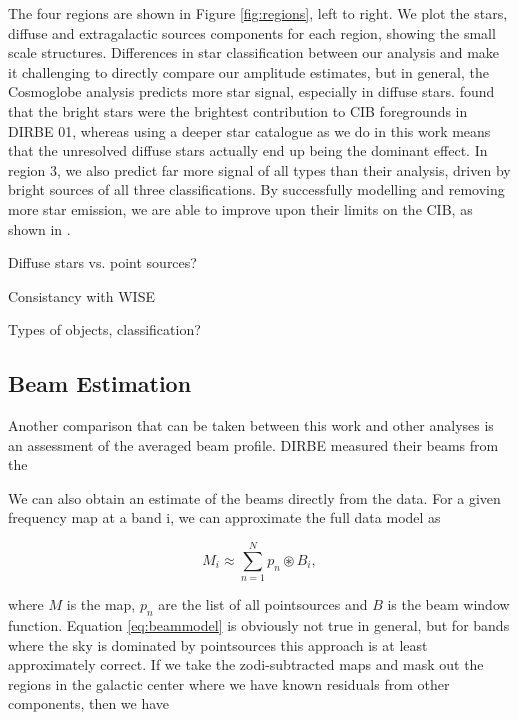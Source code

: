 \documentclass{aa}
\begin{document}
The four regions are shown in Figure \ref{fig:regions}, left to right. We plot the stars, diffuse and extragalactic sources components for each region, showing the small scale structures. Differences in star classification between our analysis and \cite{DIRBE2mass} make it challenging to directly compare our amplitude estimates, but in general, the Cosmoglobe analysis predicts more star signal, especially in diffuse stars. \cite{DIRBE2mass} found that the bright stars were the brightest contribution to CIB foregrounds in DIRBE 01, whereas using a deeper star catalogue as we do in this work means that the unresolved diffuse stars actually end up being the dominant effect. In region 3, we also predict far more signal of all types than their analysis, driven by bright sources of all three classifications. By successfully modelling and removing more star emission, we are able to improve upon their limits on the CIB, as shown in \cite{CG02_02}. 


Diffuse stars vs. point sources? 

Consistancy with WISE

Types of objects, classification?

\subsection{Beam Estimation}

Another comparison that can be taken between this work and other analyses is an assessment of the averaged beam profile. DIRBE measured their beams from the 

We can also obtain an estimate of the beams directly from the data. For a given frequency map at a band i, we can approximate the full data model as 

\begin{equation}
M_i \approx \sum_{n=1}^{N} p_n \circledast B_i,
\label{eq:beammodel}
\end{equation}

where $M$ is the map, $p_n$ are the list of all pointsources and $B$ is the beam window function. Equation \ref{eq:beammodel} is obviously not true in general, but for bands where the sky is dominated by pointsources this approach is at least approximately correct. If we take the zodi-subtracted maps and mask out the regions in the galactic center where we have known residuals from other components, then we have 
\end{document}
